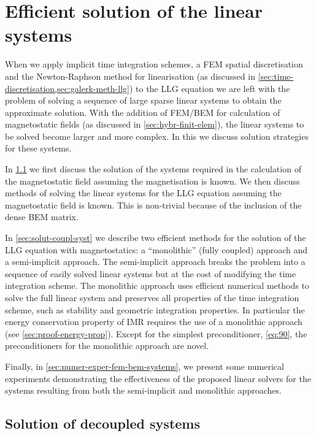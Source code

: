 \chapter{Efficient solution of the linear systems}
\label{sec:solution-strategies}

When we apply implicit time integration schemes, a FEM spatial discretisation and the Newton-Raphson method for linearisation (as discussed in \cref{sec:time-discretisation,sec:galerk-meth-llg}) to the LLG equation we are left with the problem of solving a sequence of large sparse linear systems to obtain the approximate solution.
With the addition of FEM/BEM for calculation of magnetostatic fields (as discussed in \cref{sec:hybr-finit-elem}), the linear systems to be solved become larger and more complex.
In this  we discuss solution strategies for these systems.

In \cref{sec:llg-only-system} we first discuss the solution of the systems required in the calculation of the magnetostatic field assuming the magnetisation is known.
We then discuss methods of solving the linear systems for the LLG equation assuming the magnetostatic field is known.
This is non-trivial because of the inclusion of the dense BEM matrix.

In \cref{sec:solut-coupl-syst} we describe two efficient methods for the solution of the LLG equation with magnetostatics: a ``monolithic'' (\ie fully coupled) approach and a semi-implicit approach.
The semi-implicit approach breaks the problem into a sequence of easily solved linear systems but at the cost of modifying the time integration scheme.
The monolithic approach uses efficient numerical methods to solve the full linear system and preserves all properties of the time integration scheme, such as stability and geometric integration properties.
In particular the energy conservation property of IMR requires the use of a monolithic approach (see \cref{sec:proof-energy-prop}).
Except for the simplest preconditioner, \cref{eq:90}, the preconditioners for the monolithic approach are novel.

Finally, in \cref{sec:numer-exper-fem-bem-systems}, we present some numerical experiments demonstrating the effectiveness of the proposed linear solvers for the systems resulting from both the semi-implicit and monolithic approaches.



\section{Solution of decoupled systems}
\label{sec:llg-only-system}

